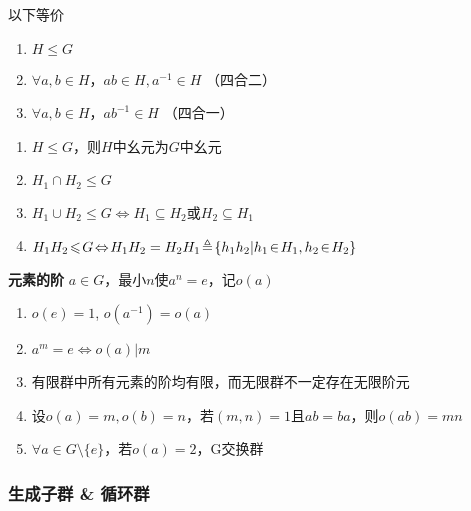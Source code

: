 \documentclass[a4paper,10pt]{ctexart}
\renewcommand*{\iff}{\Leftrightarrow}
\renewcommand*{\leq}{\leqslant}
\begin{document}
\begin{multicols}{3}
    \begin{theorem}[子群判则]
        以下等价
        \begin{enumerate}
            \item $H \leq G$
            \item $\forall a, b \!\in\! H$，$ab \!\in\! H, a^{-1} \!\in\! H$ （四合二）
            \item $\forall a, b \!\in\! H$，$ab^{-1} \!\in\! H$ （四合一）
        \end{enumerate}
    \end{theorem}

    \begin{theorem}[子群运算律($H_1, H_2 \!\leq\! G$)]
        \hfil

        \begin{enumerate}
            \item $H \!\leq\! G$，则$H$中幺元为$G$中幺元
            \item $H_1 \!\cap\! H_2 \!\leq\! G$
            \item $H_1 \!\cup\! H_2 \!\leq\! G \!\iff\! H_1 \!\subseteq\! H_2 $或$H_2 \!\subseteq\! H_1$
            \item $H_1 H_2 \!\leq\! G \!\iff\! H_1 H_2 = H_2 H_1 \\ \!\triangleq\! \{h_1h_2 | h_1 \!\in\! H_1, h_2 \!\in\! H_2\}$
        \end{enumerate}
    \end{theorem}

    \textbf{元素的阶} $a \!\in\! G$，最小$n$使$a^n \!=\! e$，记$o(a)$

    \begin{theorem}[阶的性质]
        \hfil

        \begin{enumerate}
            \item $o(e) = 1$, $o(a^{-1}) = o(a)$
            \item $a^m = e \iff o(a) | m$
            \item 有限群中所有元素的阶均有限，而无限群不一定存在无限阶元
            \item 设$o(a) = m, o(b) = n$，若$(m, n) = 1$且$ab = ba$，则$o(ab) = mn$
            \item $\forall a \!\in\! G \!\setminus\! \{e\}$，若$o(a) = 2$，G交换群
        \end{enumerate}
    \end{theorem}

    \subsubsection{生成子群 \& 循环群}


\end{multicols}
\end{document}
